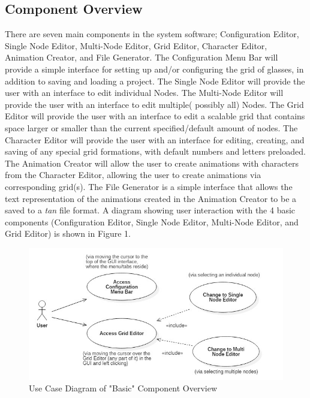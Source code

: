\documentclass[12pt]{article}
\begin{document}
	\subsection {Component Overview}
  	There are seven main components in the system software; Configuration Editor, Single Node Editor, Multi-Node Editor, Grid Editor, Character Editor, Animation Creator, and File Generator. The Configuration Menu Bar will provide a simple interface for setting up and/or configuring the grid of glasses, in addition to saving and loading a project. The Single Node Editor will provide the user with an interface to edit individual Nodes. The Multi-Node Editor will provide the user with an interface to edit multiple( possibly all) Nodes. The Grid Editor will provide the user with an interface to edit a scalable grid that contains space larger or smaller than the current specified/default amount of nodes. The Character Editor will provide the user with an interface for editing, creating, and saving of any special grid formations, with default numbers and letters preloaded. The Animation Creator will allow the user to create animations with characters from the Character Editor, allowing the user to create animations via corresponding grid(s). The File Generator is a simple interface that allows the text representation of the animations created in the Animation Creator to be a saved to a \textit{tan} file format. A diagram showing user interaction with the 4 basic components (Configuration Editor, Single Node Editor, Multi-Node Editor, and Grid Editor) is shown in Figure 1.	
  	\begin{figure}[ht!]
  		\centering
  		\includegraphics[width=\linewidth]{ComponetOverview.JPG}
  		\caption{Use Case Diagram of "Basic" Component Overview \label{overflow}}
  	\end{figure}
	
  
\end{document}
